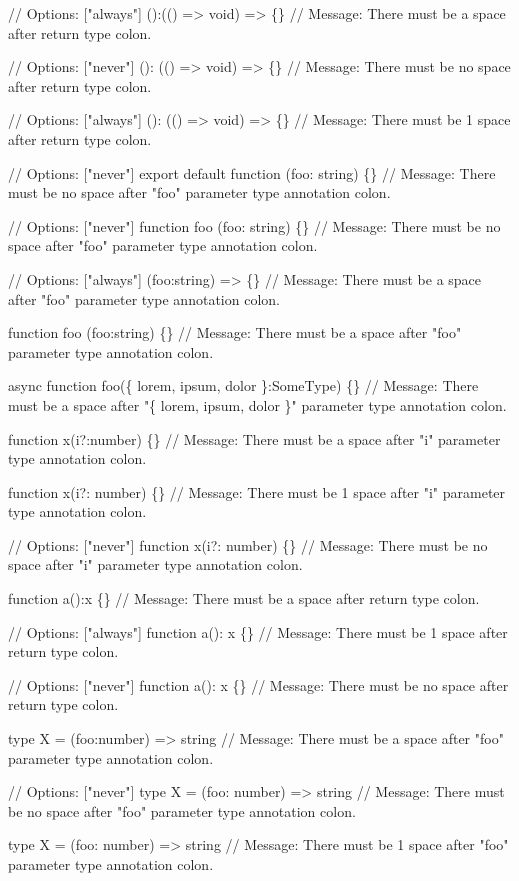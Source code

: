 \begin{DoxyCode}
// Options: ["always"]
():(() => void) => \{\}
// Message: There must be a space after return type colon.

// Options: ["never"]
(): (() => void) => \{\}
// Message: There must be no space after return type colon.

// Options: ["always"]
():  (() => void) => \{\}
// Message: There must be 1 space after return type colon.

// Options: ["never"]
export default function (foo: string) \{\}
// Message: There must be no space after "foo" parameter type annotation colon.

// Options: ["never"]
function foo (foo: string) \{\}
// Message: There must be no space after "foo" parameter type annotation colon.

// Options: ["always"]
(foo:string) => \{\}
// Message: There must be a space after "foo" parameter type annotation colon.

function foo (foo:string) \{\}
// Message: There must be a space after "foo" parameter type annotation colon.

async function foo(\{ lorem, ipsum, dolor \}:SomeType) \{\}
// Message: There must be a space after "\{ lorem, ipsum, dolor \}" parameter type annotation colon.

function x(i?:number) \{\}
// Message: There must be a space after "i" parameter type annotation colon.

function x(i?:  number) \{\}
// Message: There must be 1 space after "i" parameter type annotation colon.

// Options: ["never"]
function x(i?: number) \{\}
// Message: There must be no space after "i" parameter type annotation colon.

function a():x \{\}
// Message: There must be a space after return type colon.

// Options: ["always"]
function a():  x \{\}
// Message: There must be 1 space after return type colon.

// Options: ["never"]
function a(): x \{\}
// Message: There must be no space after return type colon.

type X = (foo:number) => string
// Message: There must be a space after "foo" parameter type annotation colon.

// Options: ["never"]
type X = (foo: number) => string
// Message: There must be no space after "foo" parameter type annotation colon.

type X = (foo:  number) => string
// Message: There must be 1 space after "foo" parameter type annotation colon.


\end{DoxyCode}
